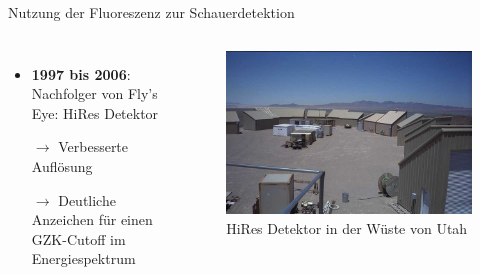 \documentclass[aspectratio=1610, professionalfonts, 9pt, hyperref={colorlinks=false}]{beamer}
\begin{document}
\begin{frame}{Nutzung der Fluoreszenz zur Schauerdetektion}
  \begin{columns}
      \begin{itemize}
        \setlength\itemsep{0.5em}
        \item \textbf{1997 bis 2006}: Nachfolger von Fly's Eye: HiRes Detektor
        \item[$\rightarrow$] Verbesserte Auflösung
        \item[$\rightarrow$] Deutliche Anzeichen für einen GZK-Cutoff im Energiespektrum

      \end{itemize}
        \vspace*{10px}
  
      \begin{figure}
          \centering
          \includegraphics[width=\linewidth]{images/image2_large.jpg}
          \caption{HiRes Detektor in der Wüste von Utah \cite{hires}}
      \end{figure}
  \end{columns}
\end{frame}
\end{document}
